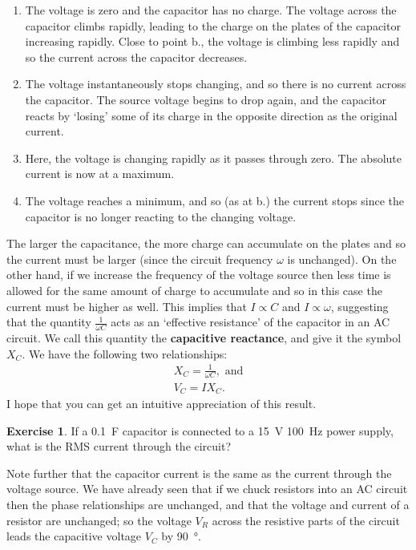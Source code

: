 \documentclass[a4paper]{amsbook}
\theoremstyle{definition}
\newtheorem{exercise}{Exercise}
\numberwithin{exercise}{chapter}
\numberwithin{exercise}{chapter}
\begin{document}
\begin{enumerate}[label=\alph*]
  \item The voltage is zero and the capacitor has no charge. The voltage across the capacitor climbs rapidly, leading to the charge on
        the plates of the capacitor increasing rapidly. Close to point b., the voltage is climbing less rapidly and so the current across
        the capacitor decreases.
  \item The voltage instantaneously stops changing, and so there is no current across the capacitor. The source voltage begins to drop again,
        and the capacitor reacts by `losing' some of its charge in the opposite direction as the original current.
  \item Here, the voltage is changing rapidly as it passes through zero. The absolute current is now at a maximum.
  \item The voltage reaches a minimum, and so (as at b.) the current stops since the capacitor is no longer reacting to the changing voltage.
\end{enumerate}

The larger the capacitance, the more charge can accumulate on the plates and so the current must be larger (since the circuit frequency $ \omega $
is unchanged). On the other hand, if we increase the frequency of the voltage source then less time is allowed for the same amount of charge
to accumulate and so in this case the current must be higher as well. This implies that $ I \propto C $ and $ I \propto \omega $, suggesting that
the quantity $ \frac{1}{\omega C} $ acts as an `effective resistance' of the capacitor in an AC circuit. We call this quantity the \textbf{capacitive
reactance}, and give it the symbol $ X_C $. We have the following two relationships:
\begin{gather}
  X_C = \frac{1}{\omega C}, \text{ and}\\
  V_C = I X_C.
\end{gather}
I hope that you can get an intuitive appreciation of this result.

\begin{exercise}
  If a \SI{0.1}{\farad} capacitor is connected to a \SI{15}{\volt} \SI{100}{\hertz} power supply, what is the RMS current through the circuit?
\end{exercise}

Note further that the capacitor current is the same as the current through the voltage source. We have already seen that if we chuck resistors
into an AC circuit then the phase relationships are unchanged, and that the voltage and current of a resistor are unchanged; so the voltage $ V_R $
across the resistive parts of the circuit leads the capacitive voltage $ V_C $ by \SI{90}{\degree}.
\end{document}
